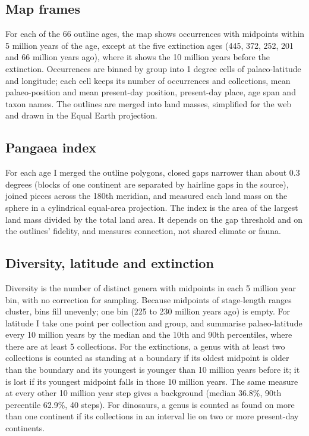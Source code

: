 \documentclass[11pt,a4paper]{article}
\begin{document}
\subsection{Map frames}
For each of the 66 outline ages, the map shows occurrences with midpoints within 5 million years of the age, except at the five extinction ages (445, 372, 252, 201 and 66 million years ago), where it shows the 10 million years before the extinction. Occurrences are binned by group into 1 degree cells of palaeo-latitude and longitude; each cell keeps its number of occurrences and collections, mean palaeo-position and mean present-day position, present-day place, age span and taxon names. The outlines are merged into land masses, simplified for the web and drawn in the Equal Earth projection.

\subsection{Pangaea index}
For each age I merged the outline polygons, closed gaps narrower than about 0.3 degrees (blocks of one continent are separated by hairline gaps in the source), joined pieces across the 180th meridian, and measured each land mass on the sphere in a cylindrical equal-area projection. The index is the area of the largest land mass divided by the total land area. It depends on the gap threshold and on the outlines' fidelity, and measures connection, not shared climate or fauna.

\subsection{Diversity, latitude and extinction}
Diversity is the number of distinct genera with midpoints in each 5 million year bin, with no correction for sampling. Because midpoints of stage-length ranges cluster, bins fill unevenly; one bin (225 to 230 million years ago) is empty. For latitude I take one point per collection and group, and summarise palaeo-latitude every 10 million years by the median and the 10th and 90th percentiles, where there are at least 5 collections. For the extinctions, a genus with at least two collections is counted as standing at a boundary if its oldest midpoint is older than the boundary and its youngest is younger than 10 million years before it; it is lost if its youngest midpoint falls in those 10 million years. The same measure at every other 10 million year step gives a background (median 36.8\%, 90th percentile 62.9\%, 40 steps). For dinosaurs, a genus is counted as found on more than one continent if its collections in an interval lie on two or more present-day continents.
\end{document}
